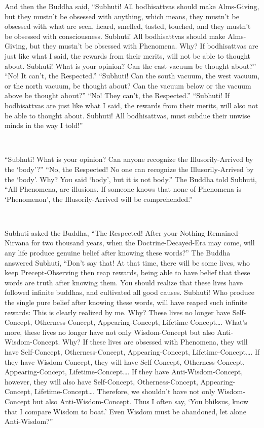 \documentclass[a5paper,12pt]{book}
\begin{document}
     And then the Buddha said, ``Subhuti! All bodhisattvas should make Alms-Giving, but they mustn't be obsessed with anything, which means, they mustn't be obsessed with what are seen, heard, smelled, tasted, touched, and they mustn't be obsessed with consciousness. Subhuti! All bodhisattvas should make Alms-Giving, but they mustn't be obsessed with Phenomena. Why? If bodhisattvas are just like what I said, the rewards from their merits, will not be able to thought about. Subhuti! What is your opinion? Can the east vacuum be thought about?'' ``No! It can't, the Respected.'' ``Subhuti! Can the south vacuum, the west vacuum, or the north vacuum, be thought about? Can the vacuum below or the vacuum above be thought about?'' ``No! They can't, the Respected.'' ``Subhuti! If bodhisattvas are just like what I said, the rewards from their merits, will also not be able to thought about. Subhuti! All bodhisattvas, must subdue their unwise minds in the way I told!''

    ~

     ``Subhuti! What is your opinion? Can anyone recognize the Illusorily-Arrived by the `body'?'' ``No, the Respected! No one can recognize the Illusorily-Arrived by the `body'. Why? You said `body', but it is not body.'' The Buddha told Subhuti, ``All Phenomena, are illusions. If someone knows that none of Phenomena is `Phenomenon', the Illusorily-Arrived will be comprehended.''

    ~

     Subhuti asked the Buddha, ``The Respected! After your Nothing-Remained-Nirvana for two thousand years, when the Doctrine-Decayed-Era may come, will any life produce genuine belief after knowing these words?'' The Buddha answered Subhuti, ``Don't say that! At that time, there will be some lives, who keep Precept-Observing then reap rewards, being able to have belief that these words are truth after knowing them. You should realize that these lives have followed infinite buddhas, and cultivated all good causes. Subhuti! Who produce the single pure belief after knowing these words, will have reaped such infinite rewards: This is clearly realized by me. Why? These lives no longer have Self-Concept, Otherness-Concept, Appearing-Concept, Lifetime-Concept\dots{}. What's more, these lives no longer have not only Wisdom-Concept but also Anti-Wisdom-Concept. Why? If these lives are obsessed with Phenomena, they will have Self-Concept, Otherness-Concept, Appearing-Concept, Lifetime-Concept\dots{}. If they have Wisdom-Concept, they will have Self-Concept, Otherness-Concept, Appearing-Concept, Lifetime-Concept\dots{}. If they have Anti-Wisdom-Concept, however, they will also have Self-Concept, Otherness-Concept, Appearing-Concept, Lifetime-Concept\dots{}. Therefore, we shouldn't have not only Wisdom-Concept but also Anti-Wisdom-Concept. Thus I often say, `You bhiksus, know that I compare Wisdom to boat.' Even Wisdom must be abandoned, let alone Anti-Wisdom?''
\end{document}
